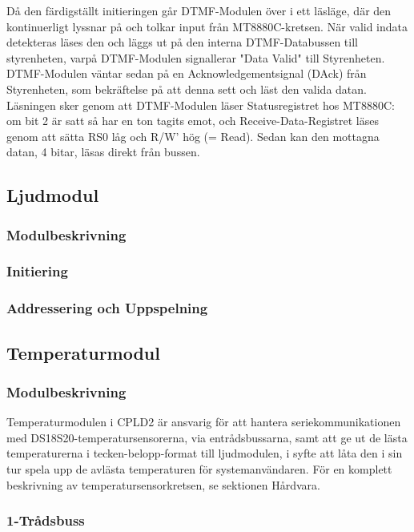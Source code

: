 \documentclass[a4paper,11pt]{article}
\begin{document}
	Då den färdigställt initieringen går DTMF-Modulen över i ett läsläge, där den kontinuerligt lyssnar på och
	tolkar input från MT8880C-kretsen. När valid indata detekteras läses den och läggs ut på den interna
	DTMF-Databussen till styrenheten, varpå DTMF-Modulen signallerar "Data Valid" till Styrenheten. DTMF-Modulen
	väntar sedan på en Acknowledgementsignal (DAck) från Styrenheten, som bekräftelse på att denna sett och läst
	den valida datan. Läsningen sker genom att DTMF-Modulen läser Statusregistret hos MT8880C: om bit 2 är satt
	så har en ton tagits emot, och Receive-Data-Registret läses genom att sätta RS0 låg och R/W' hög (= Read).
	Sedan kan den mottagna datan, 4 bitar, läsas direkt från bussen.

	\subsection{Ljudmodul}

		\subsubsection{Modulbeskrivning}

		\subsubsection{Initiering}

		\subsubsection{Addressering och Uppspelning}

	\subsection{Temperaturmodul}

	\subsubsection{Modulbeskrivning}

	Temperaturmodulen i CPLD2 är ansvarig för att hantera seriekommunikationen med 
	DS18S20-temperatursensorerna, via entrådsbussarna, samt att ge ut de lästa temperaturerna
	i tecken-belopp-format till ljudmodulen, i syfte att låta den i sin tur spela upp de avlästa
	temperaturen för systemanvändaren. För en komplett beskrivning av temperatursensorkretsen, se sektionen Hårdvara.

	\subsubsection{1-Trådsbuss}
\end{document}
